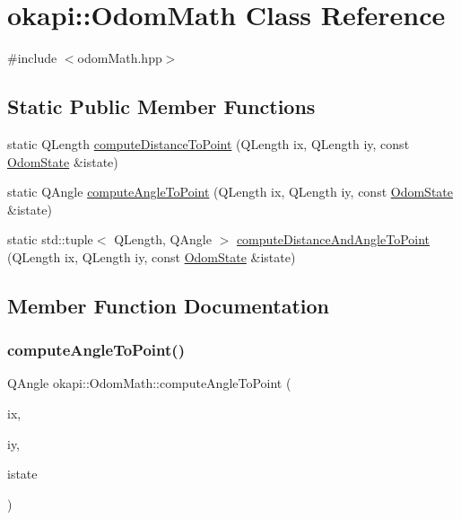 \hypertarget{classokapi_1_1OdomMath}{}\section{okapi\+::Odom\+Math Class Reference}
\label{classokapi_1_1OdomMath}


{\ttfamily \#include $<$odom\+Math.\+hpp$>$}

\subsection*{Static Public Member Functions}
\begin{DoxyCompactItemize}
\item 
static Q\+Length \mbox{\hyperlink{classokapi_1_1OdomMath_ac81f741da8bbd4563314b2f44b2d2098}{compute\+Distance\+To\+Point}} (Q\+Length ix, Q\+Length iy, const \mbox{\hyperlink{structokapi_1_1OdomState}{Odom\+State}} \&istate)
\item 
static Q\+Angle \mbox{\hyperlink{classokapi_1_1OdomMath_a96413a2d30c4bf9c5e17accf06c5ea4f}{compute\+Angle\+To\+Point}} (Q\+Length ix, Q\+Length iy, const \mbox{\hyperlink{structokapi_1_1OdomState}{Odom\+State}} \&istate)
\item 
static std\+::tuple$<$ Q\+Length, Q\+Angle $>$ \mbox{\hyperlink{classokapi_1_1OdomMath_a69dfaa5262378560c644cd56a6f495b0}{compute\+Distance\+And\+Angle\+To\+Point}} (Q\+Length ix, Q\+Length iy, const \mbox{\hyperlink{structokapi_1_1OdomState}{Odom\+State}} \&istate)
\end{DoxyCompactItemize}


\subsection{Member Function Documentation}
\mbox{\label{classokapi_1_1OdomMath_a96413a2d30c4bf9c5e17accf06c5ea4f}} 
\subsubsection{\texorpdfstring{computeAngleToPoint()}{computeAngleToPoint()}}
{\footnotesize\ttfamily Q\+Angle okapi\+::\+Odom\+Math\+::compute\+Angle\+To\+Point (\begin{DoxyParamCaption}\item[{Q\+Length}]{ix,  }\item[{Q\+Length}]{iy,  }\item[{const \mbox{\hyperlink{structokapi_1_1OdomState}{Odom\+State}} \&}]{istate }\end{DoxyParamCaption})\hspace{0.3cm}{\ttfamily [static]}}

